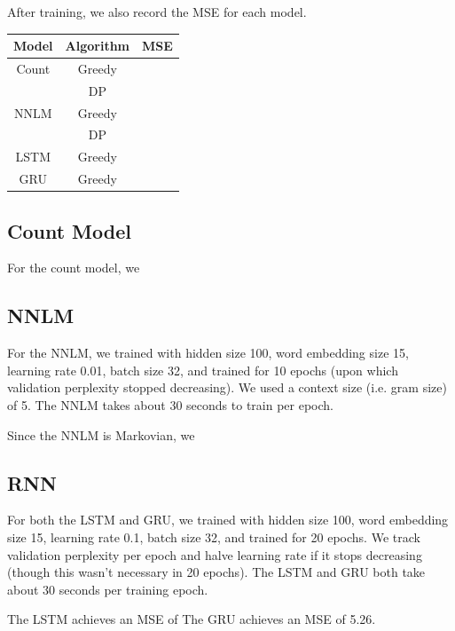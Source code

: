 \documentclass[11pt]{article}
\begin{document}
After training, we also record the MSE for each model.

\begin{center}
  \begin{tabular}{| c | c | c |}
    \hline Model & Algorithm & MSE \\
    \hline Count & Greedy & \\
    & DP & \\
    NNLM & Greedy & \\
    & DP & \\
    LSTM & Greedy & \\
    GRU & Greedy & \\
    \hline
  \end{tabular}
\end{center}

\subsection{Count Model}

For the count model, we 

\subsection{NNLM}

For the NNLM, we trained with hidden size 100, word embedding size 15, learning rate 0.01, batch size 32, and trained for 10 epochs (upon which validation perplexity stopped decreasing). We used a context size  (i.e. gram size) of 5. The NNLM takes about 30 seconds to train per epoch.

Since the NNLM is Markovian, we 

\subsection{RNN}

For both the LSTM and GRU, we trained with hidden size 100, word embedding size 15, learning rate 0.1, batch size 32, and trained for 20 epochs. We track validation perplexity per epoch and halve learning rate if it stops decreasing (though this wasn't necessary in 20 epochs). The LSTM and GRU both take about 30 seconds per training epoch.

The LSTM achieves an MSE of %
The GRU achieves an MSE of 5.26.
\end{document}

